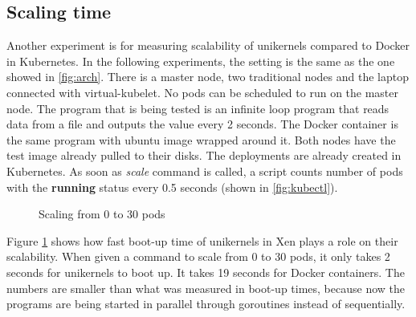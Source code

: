 \subsection{Scaling time}
Another experiment is for measuring scalability of unikernels compared to Docker in Kubernetes. In the following experiments, the setting is the same as the one showed in \ref{fig:arch}. There is a master node, two traditional nodes and the laptop connected with virtual-kubelet. No pods can be scheduled to run on the master node. The program that is being tested is an infinite loop program that reads data from a file and outputs the value every 2 seconds. The Docker container is the same program with ubuntu image wrapped around it. Both nodes have the test image already pulled to their disks. The deployments are already created in Kubernetes. As soon as \textit{scale} command is called, a script counts number of pods with the \textbf{running} status every 0.5 seconds (shown in \ref{fig:kubectl}).

\begin{figure}[htpb]
  \centering
  \caption{Scaling from 0 to 30 pods}\label{fig:scale-up-30}
  \end{figure}

Figure \ref{fig:scale-up-30} shows how fast boot-up time of unikernels in Xen plays a role on their scalability. When given a command to scale from 0 to 30 pods, it only takes 2 seconds for unikernels to boot up. It takes 19 seconds for Docker containers. The numbers are smaller than what was measured in boot-up times, because now the programs are being started in parallel through goroutines instead of sequentially.



